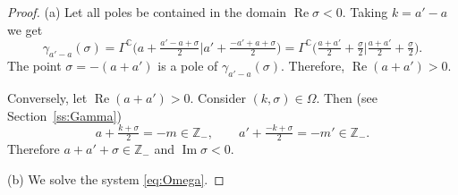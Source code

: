 \documentclass[11pt]{article}
\numberwithin{equation}{section}
\numberwithin{equation}{section}
\renewcommand{\Re}{\mathop {\mathrm {Re}}\nolimits}
\renewcommand{\Re}{\mathop {\mathrm {Re}}\nolimits}
\renewcommand{\Im}{\mathop {\mathrm {Im}}\nolimits}
\def\C {{\mathbb C }}
\def\Z{{\mathbb Z}}
\begin{document}
\begin{proof} (a)
Let all poles be contained in the domain $\Re\sigma<0$.
Taking $k=a'-a$ we get
\[
\gamma_{a'-a}(\sigma)=\Gamma^\C
\big(a+\tfrac {a'-a+\sigma}2\big|a'+\tfrac {-a'+a+\sigma}2\big)=
\Gamma^\C\big(\tfrac{a+a'}2 +\tfrac{\sigma}{2}\big|\tfrac{a+a'}2
+\tfrac{\sigma}{2}\big).
\]
The point $\sigma= -(a+a')$ is a pole of $\gamma_{a'-a}(\sigma)$.
Therefore, $\Re(a+a')>0$.

Conversely, let $\Re(a+a')>0$.
Consider $(k,\sigma)\in \Omega$.
Then (see Section~\ref{ss:Gamma})
\begin{equation}
a+\tfrac{k+\sigma}2=-m\in \Z_-, \qquad a'+\tfrac{-k+\sigma}2=-m'\in \Z_-.
\label{eq:Omega}
\end{equation}
Therefore $a+a'+\sigma\in \Z_-$ and $\Im\sigma<0$.

(b) We solve the system \eqref{eq:Omega}.
\end{proof}
\end{document}
